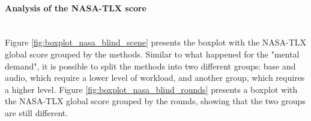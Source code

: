 %




\paragraph*{Analysis of the NASA-TLX score}\mbox{}\\

%
%
%


Figure \ref{fig:boxplot_nasa_blind_scene} presents the boxplot with the NASA-TLX global score grouped by the methods. Similar to what happened for the "mental demand", it is possible to split the methods into two different groups: base and audio, which require a lower level of workload, and another group, which requires a higher level. Figure \ref{fig:boxplot_nasa_blind_rounds} presents a boxplot with the NASA-TLX global score grouped by the rounds, showing that the two groups are still different. 

